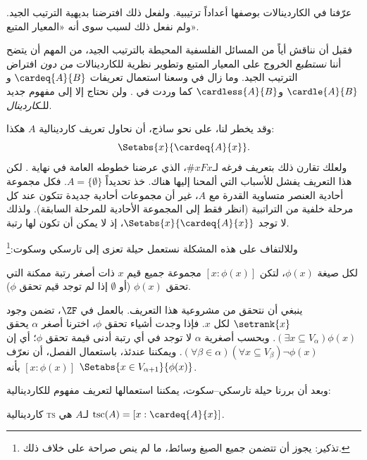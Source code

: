 \documentclass[../../../include/open-logic-section]{subfiles}
\begin{document}

عرّفنا في 
الكاردينالات بوصفها أعداداً ترتيبية. ولفعل ذلك افترضنا بديهية الترتيب
الجيد. ولم نفعل ذلك لسبب سوى أنه «المعيار المتبع».

فقبل أن نناقش أياً من المسائل الفلسفية المحيطة بالترتيب الجيد، من المهم
أن يتضح أننا \emph{نستطيع} الخروج على المعيار المتبع وتطوير نظرية
للكاردينالات \emph{من دون} افتراض الترتيب الجيد. وما زال في وسعنا
استعمال تعريفات $\cardeq{A}{B}$ و$\cardle{A}{B}$ و$\cardless{A}{B}$
كما وردت في . ولن نحتاج إلا إلى مفهوم جديد
للـ\emph{كاردينال}.

وقد يخطر لنا، على نحو ساذج، أن نحاول تعريف كاردينالية $A$ هكذا:
\[
	\Setabs{x}{\cardeq{A}{x}}.
\]
ولعلك تقارن ذلك بتعريف فرغه لـ$\# x Fx$، الذي عرضنا خطوطه العامة في
نهاية . لكن هذا التعريف يفشل للأسباب التي
ألمحنا إليها هناك. خذ تحديداً $A=\{\emptyset\}$. فكل مجموعة أحادية
العنصر متساوية القدرة مع $A$، غير أن مجموعات أحادية جديدة تتكون عند كل
مرحلة خلفية من التراتبية (انظر فقط إلى المجموعة الأحادية للمرحلة
السابقة). ولذلك لا توجد $\Setabs{x}{\cardeq{A}{x}}$، إذ لا يمكن أن تكون
لها رتبة.

وللالتفاف على هذه المشكلة نستعمل حيلة تعزى إلى تارسكي
وسكوت:\footnote{تذكير: يجوز أن تتضمن جميع الصيغ وسائط، ما لم ينص صراحة
على خلاف ذلك.}

\begin{defn}
لكل صيغة $\phi(x)$، لتكن $[ x : \phi(x)] $ مجموعة جميع قيم $x$ ذات
أصغر رتبة ممكنة التي تحقق $\phi(x)$ (أو $\emptyset$ إذا لم توجد قيم
تحقق $\phi$).
\end{defn}

ينبغي أن نتحقق من مشروعية هذا التعريف. بالعمل في $\ZF$، تضمن
 وجود $\setrank{x}$ لكل
$x$. فإذا وجدت أشياء تحقق $\phi$، اخترنا أصغر $\alpha$ يحقق
$(\exists x\subseteq V_\alpha)\phi(x)$. وبحسب أصغرية $\alpha$ لا توجد
في أي رتبة أدنى قيمة تحقق $\phi$؛ أي إن
$(\forall \beta \in \alpha)(\forall x \subseteq V_\beta)
\lnot \phi(x)$. ويمكننا عندئذ، باستعمال الفصل، أن نعرّف
$[x : \phi(x)]$ بأنه $\Setabs{x \in V_{\alpha+1}}{\phi(x)}$.

وبعد أن بررنا حيلة تارسكي--سكوت، يمكننا استعمالها لتعريف مفهوم
للكاردينالية:

\begin{defn}
كاردينالية \textsc{ts} لـ$A$ هي
$\text{tsc}(A) = [x : \cardeq{A}{x}]$.
\end{defn}
\end{document}
